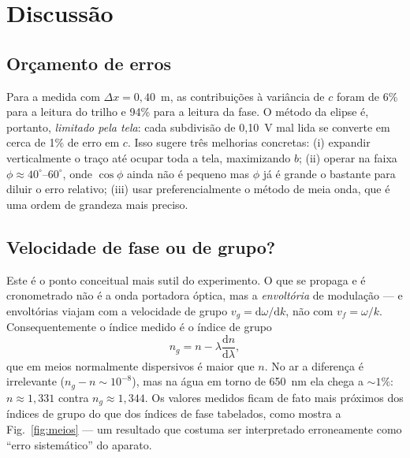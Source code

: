 \documentclass[11pt,a4paper]{article}
\begin{document}
\section{Discussão}

\subsection{Orçamento de erros}
Para a medida com $\Delta x = 0{,}40$~m, as contribuições à variância de $c$
foram de 6\% para a leitura do trilho e 94\% para a leitura
da fase. O método da elipse é, portanto, \emph{limitado pela tela}: cada
subdivisão de 0{,}10~V mal lida se converte em cerca de 1\% de erro em
$c$. Isso sugere três melhorias concretas: (i) expandir verticalmente o traço
até ocupar toda a tela, maximizando $b$; (ii) operar na faixa
$\phi \approx 40^\circ$--$60^\circ$, onde $\cos\phi$ ainda não é pequeno mas
$\phi$ já é grande o bastante para diluir o erro relativo; (iii) usar
preferencialmente o método de meia onda, que é uma ordem de grandeza mais
preciso.

\subsection{Velocidade de fase ou de grupo?}
Este é o ponto conceitual mais sutil do experimento. O que se propaga e é
cronometrado não é a onda portadora óptica, mas a \emph{envoltória} de
modulação --- e envoltórias viajam com a velocidade de grupo
$v_g = \mathrm{d}\omega/\mathrm{d}k$, não com $v_f = \omega/k$. Consequentemente
o índice medido é o índice de grupo
\begin{equation}
n_g = n - \lambda\frac{\mathrm{d}n}{\mathrm{d}\lambda},
\end{equation}
que em meios normalmente dispersivos é maior que $n$. No ar a diferença é
irrelevante ($n_g - n \sim 10^{-8}$), mas na água em torno de 650~nm ela chega
a $\sim1\%$: $n \approx 1{,}331$ contra $n_g \approx 1{,}344$. Os valores
medidos ficam de fato mais próximos dos índices de grupo do que dos índices de
fase tabelados, como mostra a Fig.~\ref{fig:meios} --- um resultado que costuma
ser interpretado erroneamente como ``erro sistemático'' do aparato.
\end{document}
